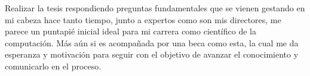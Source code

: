 \documentclass{article}
\begin{document}
\begin{itemize}
    Realizar la tesis respondiendo preguntas fundamentales que se vienen gestando en mi cabeza hace tanto tiempo, junto a expertos como son mis directores, me parece un puntapié inicial ideal para mi carrera como científico de la computación. Más aún si es acompañada por una beca como esta, la cual me da esperanza y motivación para seguir con el objetivo de avanzar el conocimiento y comunicarlo en el proceso.
\end{itemize}
\end{document}
